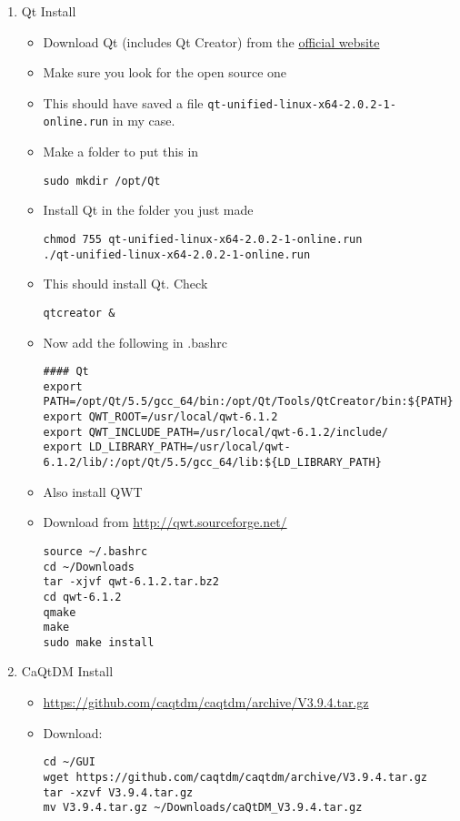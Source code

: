 \documentclass[11pt]{article}
\begin{document}
\begin{enumerate}
\item Qt Install
\label{sec-1-5-1}
\begin{itemize}
\item Download Qt (includes Qt Creator) from the \href{http://www.qt.io/}{official website}
\item Make sure you look for the open source one
\item This should have saved a file
      \verb~qt-unified-linux-x64-2.0.2-1-online.run~ in my case.
\item Make a folder to put this in
\begin{verbatim}
sudo mkdir /opt/Qt
\end{verbatim}
\item Install Qt in the folder you just made
\begin{verbatim}
chmod 755 qt-unified-linux-x64-2.0.2-1-online.run
./qt-unified-linux-x64-2.0.2-1-online.run
\end{verbatim}
\item This should install Qt. Check
\begin{verbatim}
qtcreator &
\end{verbatim}
\item Now add the following in .bashrc
\begin{verbatim}
#### Qt
export PATH=/opt/Qt/5.5/gcc_64/bin:/opt/Qt/Tools/QtCreator/bin:${PATH}
export QWT_ROOT=/usr/local/qwt-6.1.2
export QWT_INCLUDE_PATH=/usr/local/qwt-6.1.2/include/
export LD_LIBRARY_PATH=/usr/local/qwt-6.1.2/lib/:/opt/Qt/5.5/gcc_64/lib:${LD_LIBRARY_PATH}
\end{verbatim}
\item Also install QWT
\item Download from \url{http://qwt.sourceforge.net/}
\begin{verbatim}
source ~/.bashrc
cd ~/Downloads
tar -xjvf qwt-6.1.2.tar.bz2
cd qwt-6.1.2
qmake
make
sudo make install
\end{verbatim}
\end{itemize}
\item CaQtDM Install
\label{sec-1-5-2}
\begin{itemize}
\item \url{https://github.com/caqtdm/caqtdm/archive/V3.9.4.tar.gz}
\item Download:
\begin{verbatim}
cd ~/GUI
wget https://github.com/caqtdm/caqtdm/archive/V3.9.4.tar.gz
tar -xzvf V3.9.4.tar.gz
mv V3.9.4.tar.gz ~/Downloads/caQtDM_V3.9.4.tar.gz

\end{verbatim}
\end{itemize}
\end{enumerate}
\end{document}
